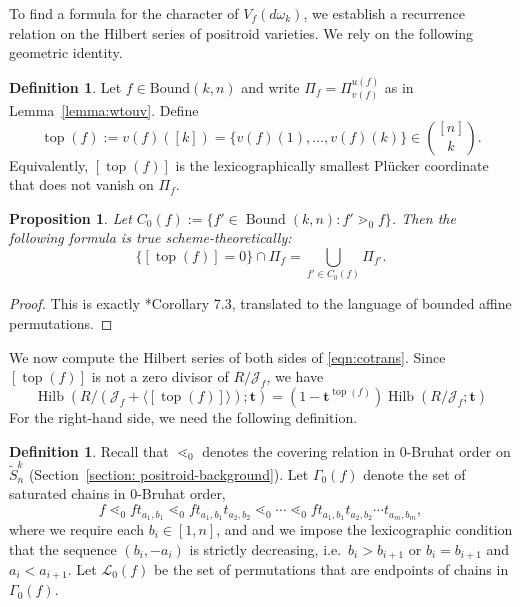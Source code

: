\documentclass[12pt,reqno]{amsart}
\newtheorem{prop}[lemma]{Proposition}
\theoremstyle{definition}
\newtheorem{definition}[lemma]{Definition}
\newcommand{\cJ}{\mathcal{J}}
\newcommand{\topp}{\operatorname{top}}
\newcommand{\bound}{\operatorname{Bound}}
\newcommand{\hilb}{\operatorname{Hilb}}
\newcommand{\Lenart}{\mathcal{L}}
\begin{document}
{To find a formula for the character of $V_f(d\omega_k)$, we establish a recurrence relation on the Hilbert series of positroid varieties. We rely on the following geometric identity. 

\begin{definition}\label{def:topp}
Let \(f\in \mathrm{Bound}(k,n)\) and write \(\Pi_f=\Pi_{v(f)}^{u(f)}\) as in Lemma~\ref{lemma:wtouv}.
Define
\[
\topp(f):=v(f)([k])=\{v(f)(1),\dots,v(f)(k)\}\in \binom{[n]}{k}.
\]
Equivalently, \([\topp(f)]\) is the lexicographically smallest Pl\"ucker coordinate that does not vanish on \(\Pi_f\).
\end{definition}





\begin{prop}
\label{prop:cut-top-point}
Let $C_0(f) := \{f'\in \bound(k,n): f'\gtrdot_0 f\}$.
Then the following formula is true scheme-theoretically:
\begin{equation}
\label{eqn:cotrans}
    \{[\topp(f)]=0\} \cap \Pi_f = \bigcup_{f'\in C_0(f)}\Pi_{f'}.
\end{equation}
\end{prop}

\begin{proof}
    This is exactly \cite{KLS13juggling}*{Corollary 7.3}, translated to the language of bounded affine permutations.
\end{proof}

We now compute the Hilbert series of both sides of \eqref{eqn:cotrans}. Since $[\topp(f)]$ is not a zero divisor of $R/\cJ_f$, we have 
\begin{equation}\label{eqn:LHS}
    \hilb(R/(\cJ_f+\langle [\topp(f)]\rangle); \mathbf{t}) = (1-\mathbf{t}^{\topp(f)}) \hilb(R/\cJ_f;\mathbf{t})
\end{equation}
For the right-hand side, we need the following definition.
\begin{definition}\label{def:L_0}
Recall that \(\lessdot_0\) denotes the covering relation in \(0\)-Bruhat order on \(\widetilde S_n^k\)
(Section~\ref{section: positroid-background}).
Let $\Gamma_0(f)$ denote the set of saturated chains in $0$-Bruhat order,
\[f\lessdot_0 ft_{a_1,b_1}\lessdot_0 ft_{a_1,b_1}t_{a_2,b_2} \lessdot_0\cdots \lessdot_0 ft_{a_1,b_1}t_{a_2,b_2}\cdots t_{a_m,b_m},\]
where we require each $b_i\in [1,n]$, and
and we impose the lexicographic condition that the sequence \((b_i,-a_i)\) is strictly decreasing,
i.e.\ \(b_i>b_{i+1}\) or \(b_i=b_{i+1}\) and \(a_i<a_{i+1}\).
Let $\Lenart_0(f)$ be the set of permutations that are endpoints of chains in $\Gamma_0(f)$.
\end{definition}

}
\end{document}
